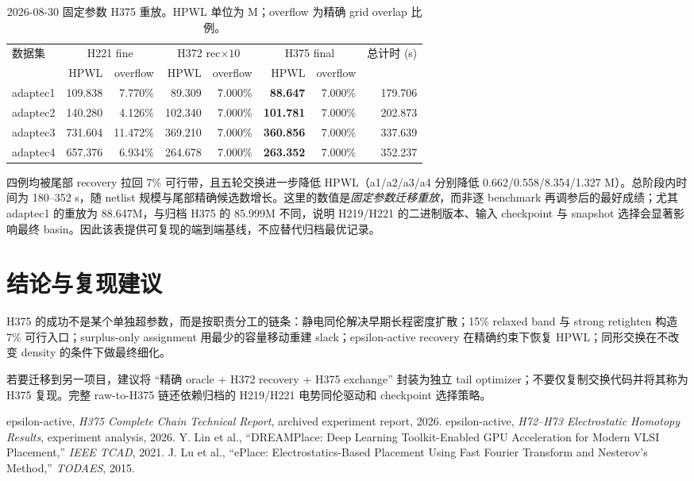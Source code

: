 \documentclass[UTF8,a4paper,11pt]{ctexrep}
\begin{document}
\begin{table}[H]
\centering\small
\caption{2026-08-30 固定参数 H375 重放。HPWL 单位为 M；overflow 为精确 grid overlap 比例。}\label{tab:replay}
\begin{tabular}{lrrrrrrr}
\toprule
数据集 & \multicolumn{2}{c}{H221 fine} & \multicolumn{2}{c}{H372 rec$\times10$} & \multicolumn{2}{c}{H375 final} & 总计时 (s)\\
 & HPWL & overflow & HPWL & overflow & HPWL & overflow & \\\midrule
adaptec1 & 109.838 & 7.770\% & 89.309 & 7.000\% & \textbf{88.647} & 7.000\% & 179.706\\
adaptec2 & 140.280 & 4.126\% & 102.340 & 7.000\% & \textbf{101.781} & 7.000\% & 202.873\\
adaptec3 & 731.604 & 11.472\% & 369.210 & 7.000\% & \textbf{360.856} & 7.000\% & 337.639\\
adaptec4 & 657.376 & 6.934\% & 264.678 & 7.000\% & \textbf{263.352} & 7.000\% & 352.237\\
\bottomrule
\end{tabular}
\end{table}

四例均被尾部 recovery 拉回 7\% 可行带，且五轮交换进一步降低 HPWL（a1/a2/a3/a4 分别降低 0.662/0.558/8.354/1.327 M）。总阶段内时间为 180--352 s，随 netlist 规模与尾部精确候选数增长。这里的数值是\emph{固定参数迁移重放}，而非逐 benchmark 再调参后的最好成绩；尤其 adaptec1 的重放为 88.647M，与归档 H375 的 85.999M 不同，说明 H219/H221 的二进制版本、输入 checkpoint 与 snapshot 选择会显著影响最终 basin。因此该表提供可复现的端到端基线，不应替代归档最优记录。

\chapter{结论与复现建议}
H375 的成功不是某个单独超参数，而是按职责分工的链条：静电同伦解决早期长程密度扩散；15\% relaxed band 与 strong retighten 构造 7\% 可行入口；surplus-only assignment 用最少的容量移动重建 slack；epsilon-active recovery 在精确约束下恢复 HPWL；同形交换在不改变 density 的条件下做最终细化。

若要迁移到另一项目，建议将 ``精确 oracle + H372 recovery + H375 exchange'' 封装为独立 tail optimizer；不要仅复制交换代码并将其称为 H375 复现。完整 raw-to-H375 链还依赖归档的 H219/H221 电势同伦驱动和 checkpoint 选择策略。

\begin{thebibliography}{9}
 epsilon-active, \emph{H375 Complete Chain Technical Report}, archived experiment report, 2026.
 epsilon-active, \emph{H72--H73 Electrostatic Homotopy Results}, experiment analysis, 2026.
 Y. Lin et al., ``DREAMPlace: Deep Learning Toolkit-Enabled GPU Acceleration for Modern VLSI Placement,'' \emph{IEEE TCAD}, 2021.
 J. Lu et al., ``ePlace: Electrostatics-Based Placement Using Fast Fourier Transform and Nesterov's Method,'' \emph{TODAES}, 2015.
\end{thebibliography}
\end{document}
